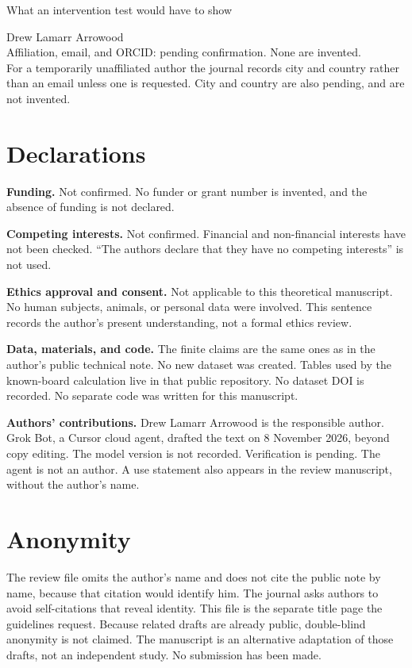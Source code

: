 \documentclass[11pt]{article}
\begin{document}
\begin{center}
{\Large What an intervention test would have to show\par}
\vspace{0.8em}
Drew Lamarr Arrowood\\
Affiliation, email, and ORCID: pending confirmation. None are invented.\\
For a temporarily unaffiliated author the journal records city and country rather than an email unless one is requested. City and country are also pending, and are not invented.
\end{center}

\section*{Declarations}
\textbf{Funding.} Not confirmed. No funder or grant number is invented, and the absence of funding is not declared.

\textbf{Competing interests.} Not confirmed. Financial and non-financial interests have not been checked. ``The authors declare that they have no competing interests'' is not used.

\textbf{Ethics approval and consent.} Not applicable to this theoretical manuscript. No human subjects, animals, or personal data were involved. This sentence records the author's present understanding, not a formal ethics review.

\textbf{Data, materials, and code.} The finite claims are the same ones as in the author's public technical note. No new dataset was created. Tables used by the known-board calculation live in that public repository. No dataset DOI is recorded. No separate code was written for this manuscript.

\textbf{Authors' contributions.} Drew Lamarr Arrowood is the responsible author. Grok Bot, a Cursor cloud agent, drafted the text on 8 November 2026, beyond copy editing. The model version is not recorded. Verification is pending. The agent is not an author. A use statement also appears in the review manuscript, without the author's name.

\section*{Anonymity}
The review file omits the author's name and does not cite the public note by name, because that citation would identify him. The journal asks authors to avoid self-citations that reveal identity. This file is the separate title page the guidelines request. Because related drafts are already public, double-blind anonymity is not claimed. The manuscript is an alternative adaptation of those drafts, not an independent study. No submission has been made.
\end{document}
